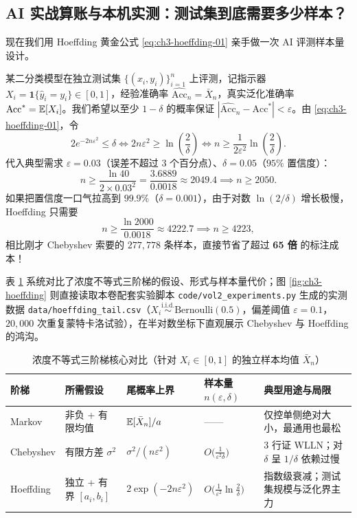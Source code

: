 \subsection{AI 实战算账与本机实测：测试集到底需要多少样本？}

现在我们用 Hoeffding 黄金公式 \eqref{eq:ch3-hoeffding-01} 亲手做一次 AI 评测样本量设计。

\begin{example}[分类模型测试集样本量计算]
\label{ex:ch3-test-size}
某二分类模型在独立测试集 $\{(x_i, y_i)\}_{i=1}^n$ 上评测，记指示器 $X_i = \mathbf{1}\{\hat{y}_i = y_i\} \in [0, 1]$，经验准确率 $\widehat{\mathrm{Acc}}_n = \bar{X}_n$，真实泛化准确率 $\mathrm{Acc}^* = \mathbb{E}[X_i]$。我们希望以至少 $1 - \delta$ 的概率保证 $|\widehat{\mathrm{Acc}}_n - \mathrm{Acc}^*| < \varepsilon$。由 \eqref{eq:ch3-hoeffding-01}，令
\[
  2 e^{-2 n \varepsilon^2} \le \delta
  \iff 2 n \varepsilon^2 \ge \ln\!\left(\frac{2}{\delta}\right)
  \iff n \ge \frac{1}{2\varepsilon^2}\ln\!\left(\frac{2}{\delta}\right).
\]
代入典型需求 $\varepsilon = 0.03$（误差不超过 $3$ 个百分点）、$\delta = 0.05$（$95\%$ 置信度）：
\[
  n \ge \frac{\ln 40}{2 \times 0.03^2} = \frac{3.6889}{0.0018} \approx 2049.4 \implies n \ge 2050.
\]
如果把置信度一口气拉高到 $99.9\%$（$\delta = 0.001$），由于对数 $\ln(2/\delta)$ 增长极慢，Hoeffding 只需要
\[
  n \ge \frac{\ln 2000}{0.0018} \approx 4222.7 \implies n \ge 4223,
\]
相比刚才 Chebyshev 索要的 $277{,}778$ 条样本，直接节省了超过 \textbf{65 倍} 的标注成本！
\end{example}

表 \ref{tab:ch3-conc-compare} 系统对比了浓度不等式三阶梯的假设、形式与样本量代价；图 \ref{fig:ch3-hoeffding} 则直接读取本卷配套实验脚本 \texttt{code/vol2\_experiments.py} 生成的实测数据 \texttt{data/hoeffding\_tail.csv}（$X_i \stackrel{\text{i.i.d.}}{\sim} \mathrm{Bernoulli}(0.5)$，偏差阈值 $\varepsilon = 0.1$，$20{,}000$ 次重复蒙特卡洛试验），在半对数坐标下直观展示 Chebyshev 与 Hoeffding 的鸿沟。

\begin{table}[htbp]
  \centering
  \caption{浓度不等式三阶梯核心对比（针对 $X_i \in [0,1]$ 的独立样本均值 $\bar{X}_n$）}
  \label{tab:ch3-conc-compare}
  \small
  \begin{tabularx}{\linewidth}{@{}p{22mm}p{30mm}p{31mm}p{27mm}X@{}}
    \toprule
    \textbf{阶梯} & \textbf{所需假设} & \textbf{尾概率上界} & \textbf{样本量 $n(\varepsilon,\delta)$} & \textbf{典型用途与局限} \\
    \midrule
    Markov & 非负 + 有限均值 & $\mathbb{E}[\bar{X}_n] / a$ & —— & 仅控单侧绝对大小，最通用也最松 \\
    Chebyshev & 有限方差 $\sigma^2$ & $\sigma^2 / (n \varepsilon^2)$ & $O\bigl(\tfrac{1}{\varepsilon^2 \delta}\bigr)$ & 3 行证 WLLN；对 $\delta$ 呈 $1/\delta$ 依赖过慢 \\
    Hoeffding & 独立 + 有界 $[a_i,b_i]$ & $2\exp(-2n\varepsilon^2)$ & $O\bigl(\tfrac{1}{\varepsilon^2}\ln\tfrac{2}{\delta}\bigr)$ & 指数级衰减；测试集规模与泛化界主力 \\
    \bottomrule
  \end{tabularx}
\end{table}


